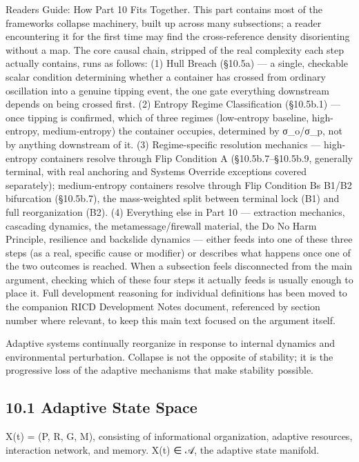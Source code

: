 \documentclass[
]{article}
\begin{document}
Readers Guide: How Part 10 Fits Together. This part contains most of the
frameworks collapse machinery, built up across many subsections; a
reader encountering it for the first time may find the cross-reference
density disorienting without a map. The core causal chain, stripped of
the real complexity each step actually contains, runs as follows: (1)
Hull Breach (§10.5a) --- a single, checkable scalar condition
determining whether a container has crossed from ordinary oscillation
into a genuine tipping event, the one gate everything downstream depends
on being crossed first. (2) Entropy Regime Classification (§10.5b.1) ---
once tipping is confirmed, which of three regimes (low-entropy baseline,
high-entropy, medium-entropy) the container occupies, determined by
σ\_o/σ\_p, not by anything downstream of it. (3) Regime-specific
resolution mechanics --- high-entropy containers resolve through Flip
Condition A (§10.5b.7--§10.5b.9, generally terminal, with real anchoring
and Systems Override exceptions covered separately); medium-entropy
containers resolve through Flip Condition Bs B1/B2 bifurcation
(§10.5b.7), the mass-weighted split between terminal lock (B1) and full
reorganization (B2). (4) Everything else in Part 10 --- extraction
mechanics, cascading dynamics, the metamessage/firewall material, the Do
No Harm Principle, resilience and backslide dynamics --- either feeds
into one of these three steps (as a real, specific cause or modifier) or
describes what happens once one of the two outcomes is reached. When a
subsection feels disconnected from the main argument, checking which of
these four steps it actually feeds is usually enough to place it. Full
development reasoning for individual definitions has been moved to the
companion RICD Development Notes document, referenced by section number
where relevant, to keep this main text focused on the argument itself.

Adaptive systems continually reorganize in response to internal dynamics
and environmental perturbation. Collapse is not the opposite of
stability; it is the progressive loss of the adaptive mechanisms that
make stability possible.

\hypertarget{adaptive-state-space}{%
\subsection{10.1 Adaptive State Space}\label{adaptive-state-space}}

X(t) = (P, R, G, M), consisting of informational organization, adaptive
resources, interaction network, and memory. X(t) ∈ 𝒜, the adaptive state
manifold.
\end{document}
